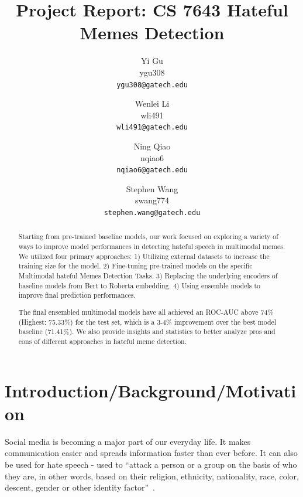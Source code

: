 \documentclass[10pt,twocolumn,letterpaper]{article}
\begin{document}
\title{Project Report: CS 7643 Hateful Memes Detection}

\author{Yi Gu\\
ygu308\\
{\tt\small ygu308@gatech.edu}
\and
Wenlei Li\\
wli491\\
{\tt\small wli491@gatech.edu}
\and
Ning Qiao\\
nqiao6\\
{\tt\small nqiao6@gatech.edu}
\and
Stephen Wang\\
swang774\\
{\tt\small stephen.wang@gatech.edu}
}

\maketitle

\begin{abstract}
   Starting from pre-trained baseline models, our work focused on exploring a variety of ways to improve model performances in detecting hateful speech in multimodal memes. We utilized four primary approaches: 1) Utilizing external datasets to increase the training size for the model. 2) Fine-tuning pre-trained models on the specific Multimodal hateful Memes Detection Tasks. 3) Replacing the underlying encoders of baseline models from Bert to Roberta embedding. 4) Using ensemble models to improve final prediction performances.
   
   The final ensembled multimodal models have all achieved an ROC-AUC above 74\% (Highest: 75.33\%) for the test set, which  is a 3-4\%  improvement over the best model baseline (71.41\%). We also provide insights and statistics to better analyze pros and cons of different approaches in hateful meme detection.
\end{abstract}

\section{Introduction/Background/Motivation}

Social media is becoming a major part of our everyday life. It makes communication easier and spreads information faster than ever before. It can also be used for hate speech - used to “attack a person or a group on the basis of who they are, in other words, based on their religion, ethnicity, nationality, race, color, descent, gender or other identity factor”~\cite{Authors1}.
\end{document}
